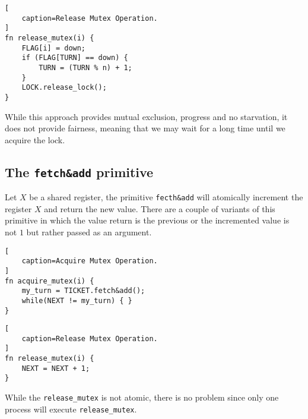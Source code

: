 \begin{lstlisting}[
    caption=Release Mutex Operation.
]
fn release_mutex(i) {
    FLAG[i] = down;
    if (FLAG[TURN] == down) {
        TURN = (TURN % n) + 1;
    }
    LOCK.release_lock();
}
\end{lstlisting}

While this approach provides mutual exclusion, progress and no starvation,
it does not provide fairness, meaning that we may wait for a long time until we acquire the lock.

\subsection{The \texttt{fetch\&add} primitive}

Let $X$ be a shared register, the primitive \texttt{fecth\&add} will atomically increment the register $X$ and return the new value.
There are a couple of variants of this primitive in which the value return is the previous or the incremented value is not $1$ but rather passed as an argument.

\begin{lstlisting}[
    caption=Acquire Mutex Operation.
]
fn acquire_mutex(i) {
    my_turn = TICKET.fetch&add();
    while(NEXT != my_turn) { }
}
\end{lstlisting}

\begin{lstlisting}[
    caption=Release Mutex Operation.
]
fn release_mutex(i) {
    NEXT = NEXT + 1;
}
\end{lstlisting}

While the \texttt{release\_mutex} is not atomic,
there is no problem since only one process will execute \texttt{release\_mutex}.